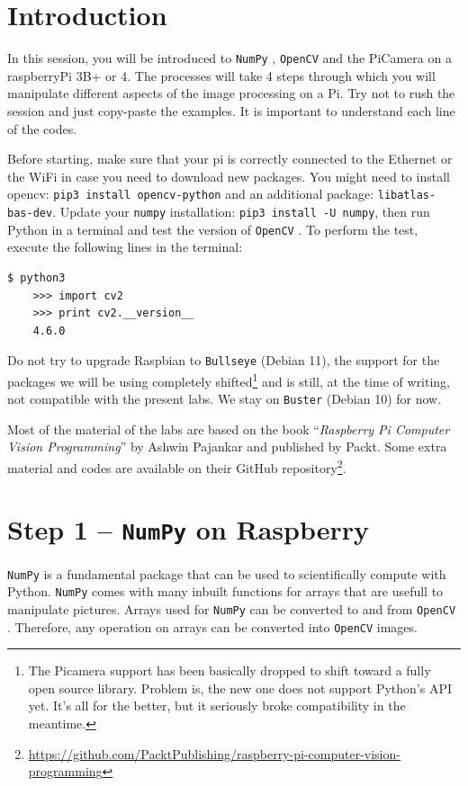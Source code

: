 \documentclass{labo}
\author{}
\newcommand{\numpy}{\texttt{NumPy} }
\newcommand{\opencv}{\texttt{OpenCV} }
\begin{document}

\section*{Introduction}
In this session, you will be introduced to \numpy, \opencv and the PiCamera on a raspberryPi 3B+ or 4. The processes will take 4 steps through which you will manipulate different aspects of the image processing on a Pi. Try not to rush the session and just copy-paste the examples. It is important to understand each line of the codes.

Before starting, make sure that your pi is correctly connected to the Ethernet or the WiFi in case you need to download new packages.
You might need to install opencv: \texttt{pip3 install opencv-python} and an additional package: \texttt{libatlas-bas-dev}.
Update your \texttt{numpy} installation: \texttt{pip3 install -U numpy}, then run Python in a terminal and test the version of \opencv. To perform the test, execute the following lines in the terminal:

\begin{verbatim}
$ python3
	>>> import cv2
	>>> print cv2.__version__
	4.6.0
\end{verbatim}

Do not try to upgrade Raspbian to \texttt{Bullseye} (Debian 11), the support for the packages we will be using completely shifted\footnote{The Picamera support has been basically dropped to shift toward a fully open source library. Problem is, the new one does not support Python's API yet. It's all for the better, but it seriously broke compatibility in the meantime.} and is still, at the time of writing, not compatible with the present labs. We stay on \texttt{Buster} (Debian 10) for now.

Most of the material of the labs are based on the book ``\textit{Raspberry Pi Computer Vision Programming}'' by Ashwin Pajankar and published by Packt. Some extra material and codes are available on their GitHub repository\footnote{\url{https://github.com/PacktPublishing/raspberry-pi-computer-vision-programming}}.


\section*{Step 1 -- \texttt{NumPy} on Raspberry}
\numpy is a fundamental package that can be used to scientifically compute with Python. \numpy comes with many inbuilt functions for arrays that are usefull to manipulate pictures. Arrays used for \numpy can be converted to and from \opencv. Therefore, any operation on arrays can be converted into \opencv images.
\end{document}
